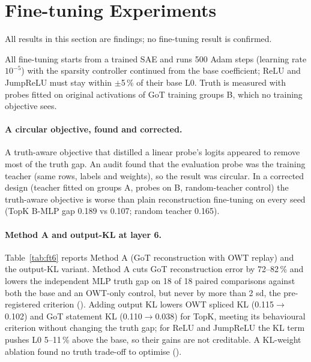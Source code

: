 \section{Fine-tuning Experiments}\label{sec:finetune}

All results in this section are  findings; no fine-tuning result is confirmed.

All fine-tuning starts from a trained SAE and runs 500 Adam steps (learning rate $10^{-5}$) with the sparsity
controller continued from the base coefficient; ReLU and JumpReLU must stay within $\pm$5\,\% of their base L0.
Truth is measured with probes fitted on original activations of GoT training groups B, which no training objective
sees.

\paragraph{A circular objective, found and corrected.} A truth-aware objective that distilled a linear probe's logits
appeared to remove most of the truth gap. An audit found that the evaluation probe was the training teacher (same
rows, labels and weights), so the result was circular. In a corrected design (teacher fitted on groups A, probes on B,
random-teacher control) the truth-aware objective is worse than plain reconstruction fine-tuning on every seed
(TopK B-MLP gap 0.189 vs 0.107; random teacher 0.165).

\paragraph{Method A and output-KL at layer 6.} Table~\ref{tab:ft6} reports Method A (GoT reconstruction with OWT
replay) and the output-KL variant. Method A cuts GoT reconstruction error by 72--82\,\% and lowers the independent MLP
truth gap on 18 of 18 paired comparisons against both the base and an OWT-only control, but never by more than 2 sd,
the pre-registered criterion (). Adding output KL lowers OWT spliced KL (0.115$\to$0.102) and GoT
statement KL (0.110$\to$0.038) for TopK, meeting its behavioural criterion without changing the truth gap; for ReLU and
JumpReLU the KL term pushes L0 5--11\,\% above the base, so their gains are not creditable. A KL-weight ablation found
no truth trade-off to optimise ().



